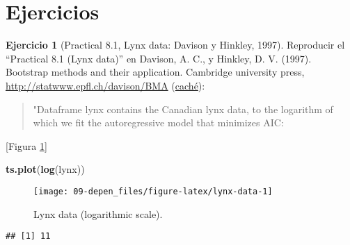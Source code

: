 \documentclass[
]{book}
\newenvironment{Shaded}{\begin{snugshade}}{\end{snugshade}}
\newcommand{\KeywordTok}[1]{\textcolor[rgb]{0.13,0.29,0.53}{\textbf{#1}}}
\newcommand{\NormalTok}[1]{#1}
\newcommand{\OperatorTok}[1]{\textcolor[rgb]{0.81,0.36,0.00}{\textbf{#1}}}
\newcommand{\StringTok}[1]{\textcolor[rgb]{0.31,0.60,0.02}{#1}}
\theoremstyle{break}
\theoremstyle{definition}
\theoremstyle{definition}
\theoremstyle{definition}
\newtheorem{exercise}{Ejercicio}[chapter]
\theoremstyle{remark}
\begin{document}
\hypertarget{ejercicios-1}{%
\section{Ejercicios}\label{ejercicios-1}}

\begin{exercise}[Practical 8.1, Lynx data: Davison y Hinkley, 1997]
\protect\hypertarget{exr:tsboot-lynx}{}{\label{exr:tsboot-lynx} \iffalse (Practical 8.1, Lynx data: Davison y Hinkley, 1997) \fi{} }
Reproducir el ``Practical 8.1 (Lynx data)'' en Davison, A. C., y Hinkley, D. V. (1997). Bootstrap methods and their application. Cambridge university press, \url{http://statwww.epfl.ch/davison/BMA}
(\href{http://webcache.googleusercontent.com/search?q=cache:a4nFL5ymMMoJ:statwww.epfl.ch/davison/BMA/+\&cd=1\&hl=gl\&ct=clnk\&gl=es}{caché}):
\end{exercise}

\begin{quote}
"Dataframe lynx contains the Canadian lynx data,
to the logarithm of which we fit the autoregressive
model that minimizes AIC:
\end{quote}

{[}Figura \ref{fig:lynx-data}{]}

\begin{Shaded}
\begin{Highlighting}[]
\KeywordTok{ts.plot}\NormalTok{(}\KeywordTok{log}\NormalTok{(lynx))}
\end{Highlighting}
\end{Shaded}

\begin{figure}[!htb]

{\centering \texttt{[image: 09-depen\_files/figure-latex/lynx-data-1]} 

}

\caption{Lynx data (logarithmic scale).}\label{fig:lynx-data}
\end{figure}

\begin{Shaded}
\end{Shaded}

\begin{verbatim}
## [1] 11
\end{verbatim}
\end{document}
